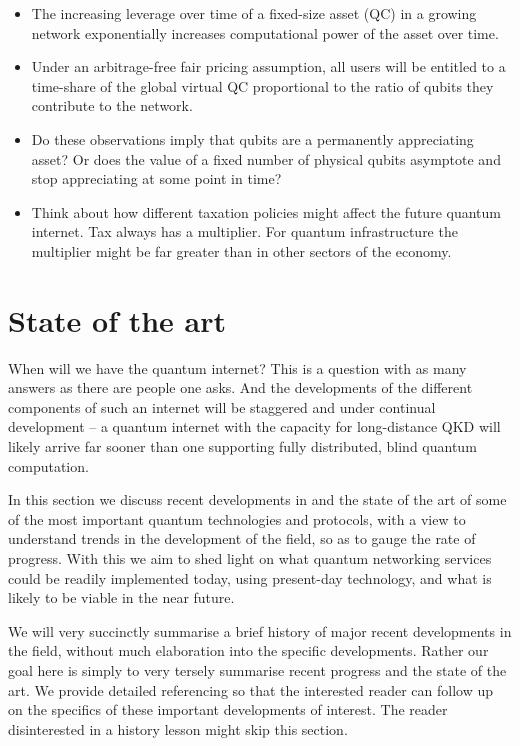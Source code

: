 \documentclass[aps,rmp,twocolumn,amsmath,amssymb,nofootinbib,superscriptaddress,longbibliography,floatfix,table-of-contents,eqsecnum]{revtex4-1}
\renewcommand{\tablename}{ALG.}
\begin{document}
\begin{itemize}
	\item The increasing leverage over time of a fixed-size asset (QC) in a growing network exponentially increases computational power of the asset over time.
	\item Under an arbitrage-free fair pricing assumption, all users will be entitled to a time-share of the global virtual QC proportional to the ratio of qubits they contribute to the network.
	\item Do these observations imply that qubits are a permanently appreciating asset? Or does the value of a fixed number of physical qubits asymptote and stop appreciating at some point in time? 
	\item Think about how different taxation policies might affect the future quantum internet. Tax always has a multiplier. For quantum infrastructure the multiplier might be far greater than in other sectors of the economy.
\end{itemize}

%
%

\section{State of the art} \label{sec:state_of_the_art} 

\renewcommand{\tablename}{TABLE}
\setcounter{table}{0}

When will we have the quantum internet? This is a question with as many answers as there are people one asks. And the developments of the different components of such an internet will be staggered and under continual development -- a quantum internet with the capacity for long-distance QKD will likely arrive far sooner than one supporting fully distributed, blind quantum computation.

In this section we discuss recent developments in and the state of the art of some of the most important quantum technologies and protocols, with a view to understand trends in the development of the field, so as to gauge the rate of progress. With this we aim to shed light on what quantum networking services could be readily implemented today, using present-day technology, and what is likely to be viable in the near future.

We will very succinctly summarise a brief history of major recent developments in the field, without much elaboration into the specific developments. Rather our goal here is simply to very tersely summarise recent progress and the state of the art. We provide detailed referencing so that the interested reader can follow up on the specifics of these important developments of interest. The reader disinterested in a history lesson might skip this section.
\end{document}
